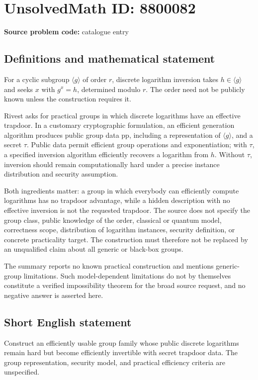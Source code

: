 \documentclass[11pt]{article}
\begin{document}
\section*{UnsolvedMath ID: 8800082}
\textbf{Source problem code:} catalogue entry
\subsection{Definitions and mathematical statement}
For a cyclic subgroup \(\langle g\rangle\) of order \(r\), discrete logarithm inversion takes \(h\in\langle g\rangle\) and seeks \(x\) with \(g^x=h\), determined modulo \(r\). The order need not be publicly known unless the construction requires it.

Rivest asks for practical groups in which discrete logarithms have an effective trapdoor. In a customary cryptographic formulation, an efficient generation algorithm produces public group data \(\mathrm{pp}\), including a representation of \(\langle g\rangle\), and a secret \(\tau\). Public data permit efficient group operations and exponentiation; with \(\tau\), a specified inversion algorithm efficiently recovers a logarithm from \(h\). Without \(\tau\), inversion should remain computationally hard under a precise instance distribution and security assumption.

Both ingredients matter: a group in which everybody can efficiently compute logarithms has no trapdoor advantage, while a hidden description with no effective inversion is not the requested trapdoor. The source does not specify the group class, public knowledge of the order, classical or quantum model, correctness scope, distribution of logarithm instances, security definition, or concrete practicality target. The construction must therefore not be replaced by an unqualified claim about all generic or black-box groups.

The summary reports no known practical construction and mentions generic-group limitations. Such model-dependent limitations do not by themselves constitute a verified impossibility theorem for the broad source request, and no negative answer is asserted here.
\subsection{Short English statement}
Construct an efficiently usable group family whose public discrete logarithms remain hard but become efficiently invertible with secret trapdoor data. The group representation, security model, and practical efficiency criteria are unspecified.
\end{document}
